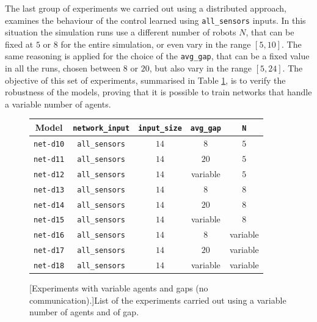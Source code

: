 The last group of experiments we carried out using a distributed approach, 
examines the behaviour of the control learned using \texttt{all\_sensors} 
inputs. In this situation the simulation runs use a different number of robots $N$, 
that can be fixed at $5$ or $8$ for the entire simulation, or even vary in the range 
$[5, 10]$. The same reasoning is applied for the choice of the \texttt{avg\_gap}, 
that can be a fixed value in all the runs, chosen between $8$ or $20$, but also 
vary in the range $[5, 24]$. 
The objective of this set of experiments, summarised in Table \ref{tab:modeldist}, 
is to verify the robustness of the models, proving that it is possible to train 
networks that handle a variable number of agents. 
\begin{figure}[H]
	\centering
	\begin{tabular}{ccccc}
		\toprule
		\textbf{Model} \quad & \textbf{\texttt{network\_input}} & 
		\textbf{\texttt{input\_size}} & \textbf{\texttt{avg\_gap}} & \textbf{\texttt{N}}\\
		\midrule
		\texttt{net-d10} 	& \texttt{all\_sensors}		&  $14$  &  $8$		 	 &	$5$ \\
		\texttt{net-d11} 	& \texttt{all\_sensors}		&  $14$  &  $20$		&	$5$ \\
		\texttt{net-d12} 	& \texttt{all\_sensors}		&  $14$  &  variable   &	$5$ \\
		\texttt{net-d13} 	& \texttt{all\_sensors}	  	&  $14$  &  $8$			 &	  $8$ \\
		\texttt{net-d14} 	& \texttt{all\_sensors}	  	&  $14$  &  $20$   		&	 $8$ \\
		\texttt{net-d15} 	& \texttt{all\_sensors}	  	&  $14$  &  variable	&	 $8$ \\
		\texttt{net-d16} 	& \texttt{all\_sensors}	  	&  $14$  &  $ 8$		  &	 variable\\
		\texttt{net-d17} 	& \texttt{all\_sensors}	  	&  $14$  &  $20$		 &	variable\\
		\texttt{net-d18} 	& \texttt{all\_sensors}	  	&  $14$  &  variable	 &	
		variable\\
		\bottomrule
	\end{tabular}
	[Experiments with variable agents and gaps (no 
	communication).]{List of the experiments carried out using a variable 
	number of agents and of gap.}
	\label{tab:modeldist}
\end{figure}

